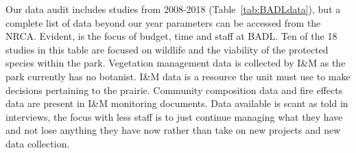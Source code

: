 Our data audit includes studies from 2008-2018 (Table~\ref{tab:BADLdata}), but a complete list of data beyond our year parameters can be accessed from the NRCA. 
Evident, is the focus of budget, time and staff at BADL. 
Ten of the 18 studies in this table are focused on wildlife and the viability of the protected species within the park.
Vegetation management data is collected by I\&M as the park currently has no botanist. 
I\&M data is a resource the unit must use to make decisions pertaining to the prairie. 
Community composition data and fire effects data are present in I\&M monitoring documents. 
Data available is scant as told in interviews, the focus with less staff is to just continue managing what they have and not lose anything they have now rather than take on new projects and new data collection.

{}
\recalctypearea
\pagestyle{plain}
\setlength{} 
\setlength\LTleft{0pt}           
